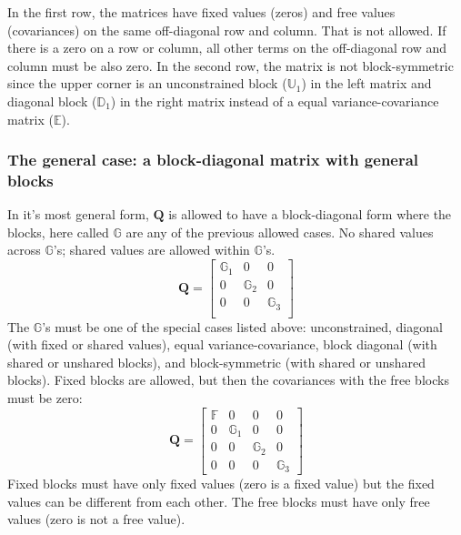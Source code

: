 \documentclass[]{article}
\def\QQ{\mbox{$\mathbf Q$}}	 \def\qq{\mbox{$\mathbf q$}}
\begin{document}
In the first row, the matrices have fixed values (zeros) and free values (covariances) on the same off-diagonal row and column.  That is not allowed.  If there is a zero on a row or column, all other terms on the off-diagonal row and column must be also zero.  In the second row, the matrix is not block-symmetric since the upper corner is an unconstrained block ($\mathbb{U}_1$) in the left matrix and diagonal block ($\mathbb{D}_1$) in the right matrix  instead of a equal variance-covariance matrix ($\mathbb{E}$).

\subsubsection{The general case: a block-diagonal matrix with general blocks}
\label{sec:Q.general}
In it's most general form, $\QQ$ is allowed to have a block-diagonal form where the blocks, here called $\mathbb{G}$ are any of the previous allowed cases.  No shared values across $\mathbb{G}$'s; shared values are allowed within $\mathbb{G}$'s.
\begin{equation*}
\QQ=
\begin{bmatrix}
\mathbb{G}_1&0&0\\
0&\mathbb{G}_2&0\\
0&0&\mathbb{G}_3\\
\end{bmatrix}
\end{equation*}
The $\mathbb{G}$'s must be one of the special cases listed above: unconstrained, diagonal (with fixed or shared values), equal variance-covariance, block diagonal (with shared or unshared blocks), and block-symmetric (with shared or unshared blocks).  Fixed blocks are allowed, but then the covariances with the free blocks must be zero:
\begin{equation*}
\QQ=
\begin{bmatrix}
\mathbb{F}&0&0&0\\
0&\mathbb{G}_1&0&0\\
0&0&\mathbb{G}_2&0\\
0&0&0&\mathbb{G}_3
\end{bmatrix}
\end{equation*}
Fixed blocks must have only fixed values (zero is a fixed value) but the fixed values can be different from each other.  The free blocks must have only free values (zero is not a free value).  
\end{document}
